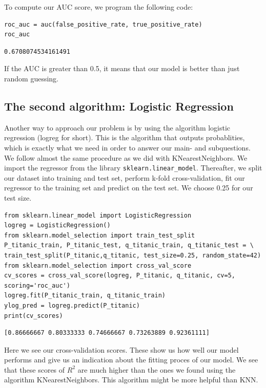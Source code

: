 \documentclass[11pt]{article}
\begin{document}
To compute our AUC score, we program the following code: 
\begin{verbatim}
roc_auc = auc(false_positive_rate, true_positive_rate)
roc_auc
\end{verbatim}

\begin{verbatim}
0.6708074534161491
\end{verbatim}

If the AUC is greater than 0.5, it means that our model is better than just random guessing. 

\newpage
\subsection{The second algorithm: Logistic Regression}
\label{sec:orgbe9cdaf}

Another way to approach our problem is by using the algorithm logistic regression (logreg for short). This is the algorithm that outputs probablities, which is exactly what we need in order to answer our main- and subquestions. We follow almost the same procedure as we did with KNearestNeighbors. We import the regressor from the library \texttt{sklearn.linear\_model}. Thereafter, we split our dataset into training and test set, perform k-fold cross-validation, fit our regressor to the training set and predict on the test set. We choose 0.25 for our test size. 

\begin{verbatim}
from sklearn.linear_model import LogisticRegression
logreg = LogisticRegression()
from sklearn.model_selection import train_test_split
P_titanic_train, P_titanic_test, q_titanic_train, q_titanic_test = \
train_test_split(P_titanic,q_titanic, test_size=0.25, random_state=42)
from sklearn.model_selection import cross_val_score
cv_scores = cross_val_score(logreg, P_titanic, q_titanic, cv=5, scoring='roc_auc')
logreg.fit(P_titanic_train, q_titanic_train)
ylog_pred = logreg.predict(P_titanic)
print(cv_scores)
\end{verbatim}

\begin{verbatim}
[0.86666667 0.80333333 0.74666667 0.73263889 0.92361111]

\end{verbatim}

Here we see our cross-validation scores. These show us how well our model performs and give us an indication about the fitting proces of our model. We see that these scores of \(R^{2}\) are much higher than the ones we found using the algorithm KNearestNeighbors. This algorithm might be more helpful than KNN. 
\end{document}
